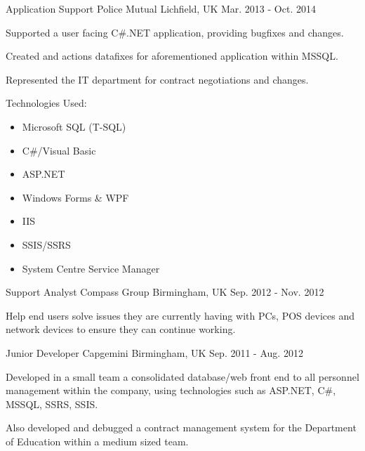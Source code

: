 \begin{cventries}
  \cventry
    {Application Support} %
    {Police Mutual} %
    {Lichfield, UK} %
    {Mar. 2013 - Oct. 2014} %
    {
        \begin{cvitems} %
            \item {Supported a user facing C\#.NET application, providing bugfixes and changes.}
            \item {Created and actions datafixes for aforementioned application within MSSQL.}
            \item {Represented the IT department for contract negotiations and changes.}
            \item {Technologies Used:}
            \begin{itemize}
                \item{Microsoft SQL (T-SQL)}
                \item{C\#/Visual Basic}
                \item{ASP.NET}
                \item{Windows Forms \& WPF}
                \item{IIS}
                \item{SSIS/SSRS}
                \item{System Centre Service Manager}
            \end{itemize}
        \end{cvitems}
    }

  \cventry
    {Support Analyst} %
    {Compass Group} %
    {Birmingham, UK} %
    {Sep. 2012 - Nov. 2012} %
    {
        \begin{cvitems} %
            \item {Help end users solve issues they are currently having with PCs, POS devices and network devices to ensure they can continue working.}
        \end{cvitems}
    }

  \cventry
    {Junior Developer} %
    {Capgemini} %
    {Birmingham, UK} %
    {Sep. 2011 - Aug. 2012} %
    {
        \begin{cvitems} %
            \item {Developed in a small team a consolidated database/web front end to all personnel management within the company, using technologies such as ASP.NET, C\#, MSSQL, SSRS, SSIS.}
            \item {Also developed and debugged a contract management system for the Department of Education within a medium sized team.}
        \end{cvitems}
    }

\end{cventries}
